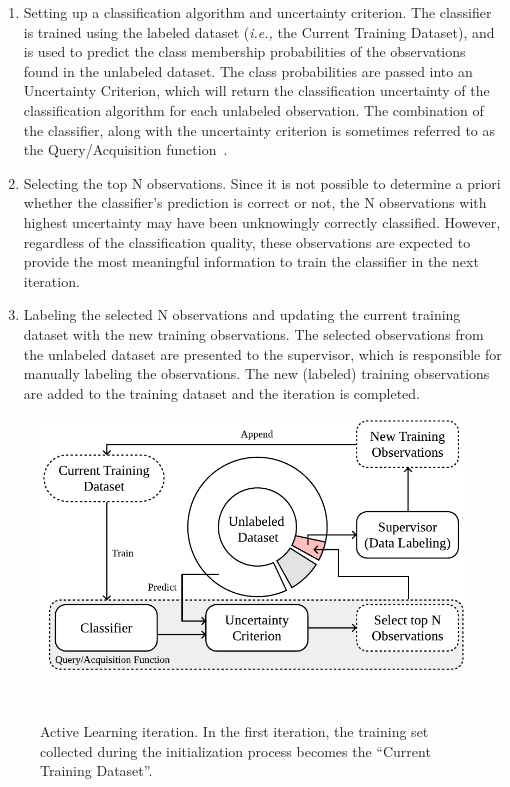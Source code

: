 \documentclass[parskip=full]{scrartcl}
\begin{document}
\begin{enumerate}

    \item Setting up a classification algorithm and uncertainty criterion. The
        classifier is trained using the labeled dataset (\textit{i.e.,} the
        Current Training Dataset), and is used to predict the class membership
        probabilities of the observations found in the unlabeled dataset. The
        class probabilities are passed into an Uncertainty Criterion, which
        will return the classification uncertainty of the classification
        algorithm for each unlabeled observation. The combination of the
        classifier, along with the uncertainty criterion is sometimes referred
        to as the Query/Acquisition function~\cite{Rosario2020}.

    \item Selecting the top N observations. Since it is not possible to
        determine a priori whether the classifier's prediction is correct or
        not, the N observations with highest uncertainty may have been
        unknowingly correctly classified. However, regardless of the
        classification quality, these observations are expected to provide the
        most meaningful information to train the classifier in the next
        iteration.

    \item Labeling the selected N observations and updating the current
        training dataset with the new training observations. The selected
        observations from the unlabeled dataset are presented to the
        supervisor, which is responsible for manually labeling the
        observations. The new (labeled) training observations are added to the
        training dataset and the iteration is completed.

\end{enumerate}

\begin{figure}[H]
	\centering
	\includegraphics[width=.65\linewidth]{../analysis/al_iteration}
    \caption{%
        Active Learning iteration. In the first iteration, the training set
        collected during the initialization process becomes the ``Current
        Training Dataset''.
    }~\label{fig:al_iteration}
\end{figure}
\end{document}
